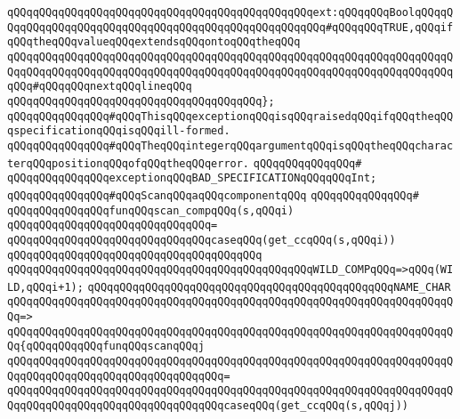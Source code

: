 \verb|qQQqqQQqqQQqqQQqqQQqqQQqqQQqqQQqqQQqqQQqqQQqqQQqext:qQQqqQQqBoolqQQqqQQqqQQqqQQqqQQqqQQqqQQqqQQqqQQqqQQqqQQqqQQqqQQqqQQq#qQQqqQQqTRUE,qQQqifqQQqtheqQQqvalueqQQqextendsqQQqontoqQQqtheqQQq|\newline
\verb|qQQqqQQqqQQqqQQqqQQqqQQqqQQqqQQqqQQqqQQqqQQqqQQqqQQqqQQqqQQqqQQqqQQqqQQqqQQqqQQqqQQqqQQqqQQqqQQqqQQqqQQqqQQqqQQqqQQqqQQqqQQqqQQqqQQqqQQqqQQqqQQq#qQQqqQQqnextqQQqlineqQQq|\newline
\verb|qQQqqQQqqQQqqQQqqQQqqQQqqQQqqQQqqQQqqQQq};|\newline
\newline
\verb|qQQqqQQqqQQqqQQq#qQQqThisqQQqexceptionqQQqisqQQqraisedqQQqifqQQqtheqQQqspecificationqQQqisqQQqill-formed.|\newline
\verb|qQQqqQQqqQQqqQQq#qQQqTheqQQqintegerqQQqargumentqQQqisqQQqtheqQQqcharacterqQQqpositionqQQqofqQQqtheqQQqerror.|\newline
\verb|qQQqqQQqqQQqqQQq#|\newline
\verb|qQQqqQQqqQQqqQQqexceptionqQQqBAD_SPECIFICATIONqQQqqQQqInt;|\newline
\newline
\verb|qQQqqQQqqQQqqQQq#qQQqScanqQQqaqQQqcomponentqQQq|\newline
\verb|qQQqqQQqqQQqqQQq#|\newline
\verb|qQQqqQQqqQQqqQQqfunqQQqscan_compqQQq(s,qQQqi)|\newline
\verb|qQQqqQQqqQQqqQQqqQQqqQQqqQQqqQQq=|\newline
\verb|qQQqqQQqqQQqqQQqqQQqqQQqqQQqqQQqcaseqQQq(get_ccqQQq(s,qQQqi))|\newline
\verb|qQQqqQQqqQQqqQQqqQQqqQQqqQQqqQQqqQQqqQQq|\newline
\verb|qQQqqQQqqQQqqQQqqQQqqQQqqQQqqQQqqQQqqQQqqQQqqQQqWILD_COMPqQQq=>qQQq(WILD,qQQqi+1);|\newline
\newline
\verb|qQQqqQQqqQQqqQQqqQQqqQQqqQQqqQQqqQQqqQQqqQQqqQQqNAME_CHAR|\newline
\verb|qQQqqQQqqQQqqQQqqQQqqQQqqQQqqQQqqQQqqQQqqQQqqQQqqQQqqQQqqQQqqQQqqQQqqQQq=>|\newline
\verb|qQQqqQQqqQQqqQQqqQQqqQQqqQQqqQQqqQQqqQQqqQQqqQQqqQQqqQQqqQQqqQQqqQQqqQQq{qQQqqQQqqQQqfunqQQqscanqQQqj|\newline
\verb|qQQqqQQqqQQqqQQqqQQqqQQqqQQqqQQqqQQqqQQqqQQqqQQqqQQqqQQqqQQqqQQqqQQqqQQqqQQqqQQqqQQqqQQqqQQqqQQqqQQqqQQq=|\newline
\verb|qQQqqQQqqQQqqQQqqQQqqQQqqQQqqQQqqQQqqQQqqQQqqQQqqQQqqQQqqQQqqQQqqQQqqQQqqQQqqQQqqQQqqQQqqQQqqQQqqQQqqQQqcaseqQQq(get_ccqQQq(s,qQQqj))|\newline

